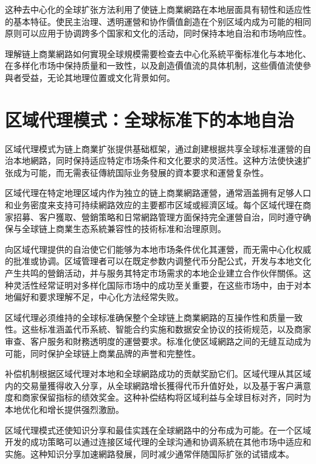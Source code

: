 \documentclass[
  Letterpaper,
]{scrbook}
\begin{document}
这种去中心化的全球扩张方法利用了使链上商業網路在本地层面具有韧性和适应性的基本特征。使民主治理、透明運營和协作價值創造在个别区域内成为可能的相同原则可以应用于协调跨多个国家和文化的活动，同时保持本地自治和市场响应性。

理解链上商業網路如何實現全球規模需要检查去中心化系統平衡标准化与本地化、在多样化市场中保持质量和一致性，以及創造價值流的具体机制，这些價值流使參與者受益，无论其地理位置或文化背景如何。

\section{区域代理模式：全球标准下的本地自治}\label{ux533aux57dfux4ee3ux7406ux6a21ux5f0fux5168ux7403ux6807ux51c6ux4e0bux7684ux672cux5730ux81eaux6cbb}

区域代理模式为链上商業扩张提供基础框架，通过創建根据共享全球标准運營的自治本地網路，同时保持适应特定市场条件和文化要求的灵活性。这种方法使快速扩张成为可能，而无需表征傳統国际业务發展的資本要求和運營复杂性。

区域代理在特定地理区域内作为独立的链上商業網路運營，通常涵盖拥有足够人口和业务密度来支持可持续網路效应的主要都市区域或經濟区域。每个区域代理在商家招募、客户獲取、營銷策略和日常網路管理方面保持完全運營自治，同时遵守确保与全球链上商業生态系統兼容性的技術标准和治理原则。

向区域代理提供的自治使它们能够为本地市场条件优化其運營，而无需中心化权威的批准或协调。区域管理者可以在既定参数内调整代币分配公式，开发与本地文化产生共鸣的營銷活动，并与服务其特定市场需求的本地企业建立合作伙伴關係。这种灵活性经常证明对多样化国际市场中的成功至关重要，在这些市场中，由于对本地偏好和要求理解不足，中心化方法经常失败。

区域代理必须维持的全球标准确保整个全球链上商業網路的互操作性和质量一致性。这些标准涵盖代币系統、智能合约实施和数据安全协议的技術规范，以及商家审查、客户服务和財務透明度的運營要求。标准化使区域網路之间的无缝互动成为可能，同时保护全球链上商業品牌的声誉和完整性。

补偿机制根据区域代理对本地和全球網路成功的贡献奖励它们。区域代理从其区域内的交易量獲得收入分享，从全球網路增长獲得代币升值好处，以及基于客户满意度和商家保留指标的绩效奖金。这种补偿结构将区域利益与全球目标对齐，同时为本地优化和增长提供强烈激励。

区域代理模式还使知识分享和最佳实践在全球網路中的分布成为可能。在一个区域开发的成功策略可以通过连接区域代理的全球沟通和协调系統在其他市场中适应和实施。这种知识分享加速網路發展，同时减少通常伴随国际扩张的试错成本。
\end{document}
